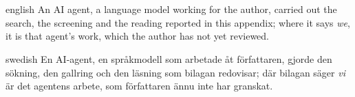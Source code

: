\section{} %
\label{sec:hpc-cli-method}


\begin{onlyin}{english} %
An AI agent, a language model working for the author, carried out the
search, the screening and the reading reported in this appendix; where
it says \emph{we}, it is that agent's work, which the author has not yet
reviewed.
\end{onlyin}
\begin{onlyin}{swedish}
En AI-agent, en språkmodell som arbetade åt författaren, gjorde den
sökning, den gallring och den läsning som bilagan redovisar; där bilagan
säger \emph{vi} är det agentens arbete, som författaren ännu inte har
granskat.
\end{onlyin}

